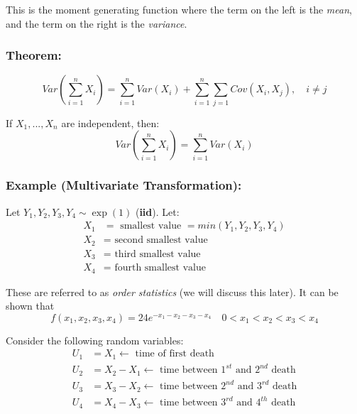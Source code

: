 \documentclass{article}
\begin{document}
This is the moment generating function where the term on the left is the \textit{mean}, and the term on the right is the \textit{variance}.


\subsubsection*{Theorem:}

\begin{equation*}
    Var\left(\sum_{i=1}^n X_i \right) = \sum_{i=1}^n Var(X_i) + \sum_{i=1}^n \sum_{j=1} Cov(X_i, X_j), \quad i \neq j
\end{equation*}

If $X_1,...,X_n$ are independent, then:
\begin{equation*}
    Var\left(\sum_{i=1}^n X_i \right) = \sum_{i=1}^n Var(X_i)
\end{equation*}


\subsubsection*{Example (Multivariate Transformation):}

Let $Y_1, Y_2, Y_3, Y_4 \sim \exp(1)$ (\textbf{iid}). Let:
\begin{equation*}
    \begin{split}
        X_1 &= \text{ smallest value } = min(Y_1,Y_2,Y_3,Y_4)\\
        X_2 &= \text{ second smallest value}\\
        X_3 &= \text{ third smallest value}\\
        X_4 &= \text{ fourth smallest value}
    \end{split}
\end{equation*}

These are referred to as \textit{order statistics} (we will discuss this later). It can be shown that
\begin{equation*}
    f(x_1, x_2, x_3, x_4) = 24 e^{-x_1 - x_2 - x_3 - x_4} \quad 0 < x_1 < x_2 < x_3 < x_4
\end{equation*}

Consider the following random variables:
\begin{equation*}
    \begin{split}
        U_1 &= X_1 \leftarrow \text{ time of first death}\\
        U_2 &= X_2 - X_1 \leftarrow \text{ time between $1^{st}$ and $2^{nd}$ death}\\
        U_3 &= X_3 - X_2 \leftarrow \text{ time between $2^{nd}$ and $3^{rd}$ death}\\
        U_4 &= X_4 - X_3 \leftarrow \text{ time between $3^{rd}$ and $4^{th}$ death}
    \end{split}
\end{equation*}
\end{document}
